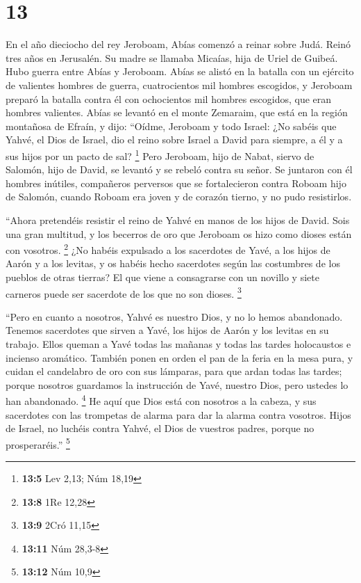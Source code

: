 \hypertarget{section-12}{%
\section{13}\label{section-12}}

 En el año dieciocho del rey Jeroboam, Abías comenzó a
reinar sobre Judá.  Reinó tres años en Jerusalén. Su madre
se llamaba Micaías, hija de Uriel de Guibeá. Hubo guerra entre Abías y
Jeroboam.  Abías se alistó en la batalla con un ejército
de valientes hombres de guerra, cuatrocientos mil hombres escogidos, y
Jeroboam preparó la batalla contra él con ochocientos mil hombres
escogidos, que eran hombres valientes.  Abías se levantó
en el monte Zemaraim, que está en la región montañosa de Efraín, y dijo:
``Oídme, Jeroboam y todo Israel:  ¿No sabéis que Yahvé, el
Dios de Israel, dio el reino sobre Israel a David para siempre, a él y a
sus hijos por un pacto de sal? \footnote{\textbf{13:5} Lev 2,13; Núm
  18,19}  Pero Jeroboam, hijo de Nabat, siervo de Salomón,
hijo de David, se levantó y se rebeló contra su señor.  Se
juntaron con él hombres inútiles, compañeros perversos que se
fortalecieron contra Roboam hijo de Salomón, cuando Roboam era joven y
de corazón tierno, y no pudo resistirlos.

 ``Ahora pretendéis resistir el reino de Yahvé en manos de
los hijos de David. Sois una gran multitud, y los becerros de oro que
Jeroboam os hizo como dioses están con vosotros. \footnote{\textbf{13:8}
  1Re 12,28}  ¿No habéis expulsado a los sacerdotes de
Yavé, a los hijos de Aarón y a los levitas, y os habéis hecho sacerdotes
según las costumbres de los pueblos de otras tierras? El que viene a
consagrarse con un novillo y siete carneros puede ser sacerdote de los
que no son dioses. \footnote{\textbf{13:9} 2Cró 11,15}

 ``Pero en cuanto a nosotros, Yahvé es nuestro Dios, y no
lo hemos abandonado. Tenemos sacerdotes que sirven a Yavé, los hijos de
Aarón y los levitas en su trabajo.  Ellos queman a Yavé
todas las mañanas y todas las tardes holocaustos e incienso aromático.
También ponen en orden el pan de la feria en la mesa pura, y cuidan el
candelabro de oro con sus lámparas, para que ardan todas las tardes;
porque nosotros guardamos la instrucción de Yavé, nuestro Dios, pero
ustedes lo han abandonado. \footnote{\textbf{13:11} Núm 28,3-8}
 He aquí que Dios está con nosotros a la cabeza, y sus
sacerdotes con las trompetas de alarma para dar la alarma contra
vosotros. Hijos de Israel, no luchéis contra Yahvé, el Dios de vuestros
padres, porque no prosperaréis.'' \footnote{\textbf{13:12} Núm 10,9}

